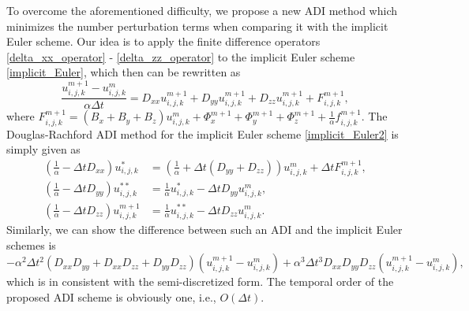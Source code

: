 \documentclass[dissertation]{uathesis}
\begin{document}
\begin{body}
\begin{flushleft}
\hspace{1cm} To overcome the aforementioned difficulty, 
we propose a new ADI method which minimizes the number perturbation terms when comparing it with the implicit Euler scheme. Our idea is to apply the finite difference operators \eqref{delta_xx_operator}  - \eqref{delta_zz_operator} to the implicit Euler scheme \eqref{implicit_Euler}, which then can be rewritten as
\begin{equation} \label{implicit_Euler2}
\frac{u^{m+1}_{i,j,k}-u^{m}_{i,j,k}}{\alpha \Delta t} = 
D_{xx} u^{m+1}_{i,j,k} +D_{yy} u^{m+1}_{i,j,k} +D_{zz} u^{m+1}_{i,j,k} + F^{m+1}_{i,j,k},
\end{equation}
where $F^{m+1}_{i,j,k}=(B_{x}+B_{y}+B_{z})u^{m}_{i,j,k}+\Phi^{m+1}_{x}+\Phi^{m+1}_{y}+\Phi^{m+1}_{z}+\frac{1}{\alpha}f^{m+1}_{i,j,k}$. 
The Douglas-Rachford ADI method for the implicit Euler scheme \eqref{implicit_Euler2} is simply given as 
\begin{align}
(\frac{1}{\alpha}-\Delta t D_{xx}) u^{*}_{i,j,k}   &= (\frac{1}{\alpha} + \Delta t(D_{yy} + D_{zz})) u^{m}_{i,j,k} + \Delta t F^{m+1}_{i,j,k}, \nonumber \\
(\frac{1}{\alpha}-\Delta t D_{yy}) u^{**}_{i,j,k}  &= \frac{1}{\alpha} u^{*}_{i,j,k} - \Delta t D_{yy} u^{m}_{i,j,k}, \label{D_ADI_operator}  \\
(\frac{1}{\alpha}-\Delta t D_{zz}) u^{m+1}_{i,j,k} &= \frac{1}{\alpha} u^{**}_{i,j,k} - \Delta t D_{zz} u^{m}_{i,j,k}. \nonumber 
\end{align}
%
Similarly, we can show the difference between such an ADI and the implicit Euler schemes is 
\begin{equation} \label{perturbation}
- \alpha^2 \Delta t^{2} (D_{xx}D_{yy} + D_{xx}D_{zz} + D_{yy}D_{zz} ) (u^{m+1}_{i,j,k}-u^{m}_{i,j,k} )
+ \alpha^3 \Delta t^{3} D_{xx}D_{yy} D_{zz}  (u^{m+1}_{i,j,k}-u^{m}_{i,j,k} ),
\end{equation}
which is in consistent with the semi-discretized form. The temporal order of the proposed ADI scheme is obviously one, i.e., $O(\Delta t)$. 


\end{flushleft}
\end{body}
\end{document}
